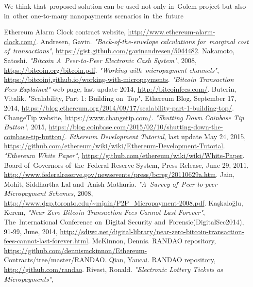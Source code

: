 \documentclass[a4paper]{article}
\begin{document}
    We think that~proposed solution can be used not only in~Golem project but also in~other one-to-many nanopayments
    scenarios in~the~future

\begin{thebibliography}{9}
 Ethereum Alarm Clock contract website, \url{http://www.ethereum-alarm-clock.com/}.
 Andresen, Gavin. \textit{"Back-of-the-envelope calculations for~marginal cost of~transactions"},
    \url{https://gist.github.com/gavinandresen/5044482}.
 Nakamoto, Satoshi. \textit{"Bitcoin A~Peer-to-Peer Electronic Cash System"}, 2008,
    \url{https://bitcoin.org/bitcoin.pdf}.
 \textit{"Working with~micropayment channels"},
    \url{https://bitcoinj.github.io/working-with-micropayments}.
 \textit{"Bitcoin Transaction Fees Explained"} web page, last update 2014, \url{http://bitcoinfees.com/}.
 Buterin, Vitalik. "Scalability, Part 1: Building on~Top", Ethereum Blog, September 17, 2014,
    \url{https://blog.ethereum.org/2014/09/17/scalability-part-1-building-top/}.
 ChangeTip website, \url{https://www.changetip.com/}.
 \textit{"Shutting Down Coinbase Tip Button"}, 2015,
    \url{https://blog.coinbase.com/2015/02/10/shutting-down-the-coinbase-tip-button/}.
 \textit{Ethereum Development Tutorial}, last update May 24, 2015,
    \url{https://github.com/ethereum/wiki/wiki/Ethereum-Development-Tutorial}.
 \textit{"Ethereum White Paper"}, \url{https://github.com/ethereum/wiki/wiki/White-Paper}.
 Board of~Governors of~the~Federal Reserve System, Press Release, June 29, 2011,
    \url{http://www.federalreserve.gov/newsevents/press/bcreg/20110629a.htm}.
 Jain, Mohit, Siddhartha Lal and~Anish Mathuria. \textit{"A~Survey of~Peer-to-peer Micropayment Schemes},
    2008, \url{http://www.dgp.toronto.edu/~mjain/P2P_Micropayment-2008.pdf}.
Kaşkaloğlu, Kerem, \textit{"Near Zero Bitcoin Transaction Fees Cannot Last Forever"},
    The~International Conference on~Digital Security and~Forensic(DigitalSec2014), 91-99, June, 2014,
    \url{http://sdiwc.net/digital-library/near-zero-bitcoin-transaction-fees-cannot-last-forever.html}.
 McKinnon, Dennis. RANDAO repository,
    \url{https://github.com/dennismckinnon/Ethereum-Contracts/tree/master/RANDAO}.
 Qian, Yaucai. RANDAO repository, \url{http://github.com/randao}.
 Rivest, Ronald. \textit{"Electronic Lottery Tickets as Micropayments"},

\end{thebibliography}
\end{document}
